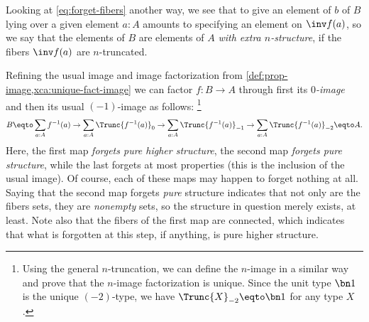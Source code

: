 Looking at \eqref{eq:forget-fibers} another way,
we see that to give an element of $b$ of $B$ lying
over a given element $a:A$ amounts to
specifying an element on $\inv f(a)$,
so we say that the elements of $B$
are elements of $A$ \emph{with extra $n$-structure},
if the fibers $\inv f(a)$ are $n$-truncated.

Refining the usual image and image factorization from
\cref{def:prop-image,xca:unique-fact-image}
we can factor $f : B \to A$ through
first its \emph{$0$-image}
and then its usual $(-1)$-image as follows:%
\footnote{Using the general $n$-truncation,
  we can define the $n$-image
  in a similar way and prove that
  the $n$-image factorization is unique.
  Since the unit type $\bn 1$ is the unique $(-2)$-type,
  we have $\Trunc{X}_{-2} \eqto \bn 1$ for any type $X$.}
\[
  B \eqto \sum_{a:A} f^{-1}(a) \to
  \sum_{a:A} \Trunc{f^{-1}(a)}_0 \to
  \sum_{a:A} \Trunc{f^{-1}(a)}_{-1} \to
  \sum_{a:A} \Trunc{f^{-1}(a)}_{-2} \eqto A.
\]
Here, the first map \emph{forgets pure higher structure},
the second map \emph{forgets pure structure},
while the last forgets at most properties
(this is the inclusion of the usual image).
Of course, each of these maps may happen to forget nothing at all.
Saying that the second map forgets \emph{pure} structure
indicates that not only are the fibers sets,
they are \emph{nonempty} sets,
so the structure in question merely exists, at least.
Note also that the fibers of the first map are connected,
which indicates that what is forgotten at this step, if anything,
is pure higher structure.

